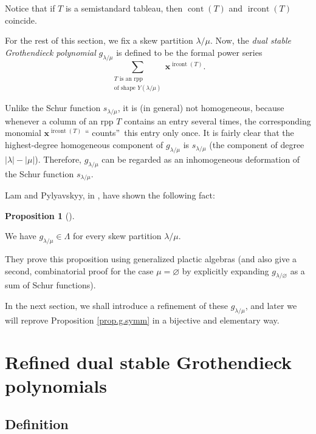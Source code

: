\documentclass[numbers=enddot,12pt,final,onecolumn,notitlepage]{scrartcl}%
\theoremstyle{definition}
\newtheorem{prop}[theo]{Proposition}
\newenvironment{proposition}[1][]
{\begin{prop}[#1]\begin{leftbar}}
{\end{leftbar}\end{prop}}
\let\sumnonlimits\sum
\renewcommand{\sum}{\sumnonlimits\limits}
\def\ircont{{\operatorname*{ircont}}}
\def\cont{{\operatorname*{cont}}}
\begin{document}
Notice that if $T$ is a semistandard tableau, then $\cont(T)$ and $\ircont(T)$ coincide.




For the rest of this section, we fix a skew partition $\lambda/\mu$. Now, the
\textit{dual stable Grothendieck polynomial} $g_{\lambda/\mu}$ is defined to
be the formal power series%
\[
\sum_{\substack{T\text{ is an rpp}\\\text{of shape }Y\left(  \lambda
/\mu\right)  }}\mathbf{x}^{\operatorname*{ircont}\left(  T\right)  }.
\]


Unlike the Schur function $s_{\lambda/\mu}$, it is (in
general) not homogeneous, because whenever a column of an rpp $T$ contains an
entry several times, the corresponding monomial $\mathbf{x}%
^{\operatorname*{ircont}\left(  T\right)  }$ \textquotedblleft
counts\textquotedblright\ this entry only once. It is fairly clear that the
highest-degree homogeneous component of $g_{\lambda/\mu}$ is $s_{\lambda/\mu}$
(the component of degree $\left\vert \lambda\right\vert -\left\vert
\mu\right\vert $). Therefore, $g_{\lambda/\mu}$ can be regarded as an
inhomogeneous deformation of the Schur function $s_{\lambda/\mu}$.

Lam and Pylyavskyy, in \cite[\S 9.1]{LamPyl}, have shown the following fact:

\begin{proposition}
\label{prop.g.symm}We have $g_{\lambda/\mu}\in\Lambda$ for every skew
partition $\lambda/\mu$.
\end{proposition}


They prove this proposition using generalized plactic algebras \cite[Lemma
3.1]{FomGre} (and also give a second, combinatorial proof for the case
$\mu=\varnothing$ by explicitly expanding $g_{\lambda/\varnothing}$ as a sum
of Schur functions).


In the next section, we shall introduce a refinement of these $g_{\lambda/\mu
}$, and later we will reprove Proposition \ref{prop.g.symm} in a
bijective 
and elementary way.

\section{\label{sect.def}Refined dual stable Grothendieck polynomials}

\subsection{Definition}
\end{document}
